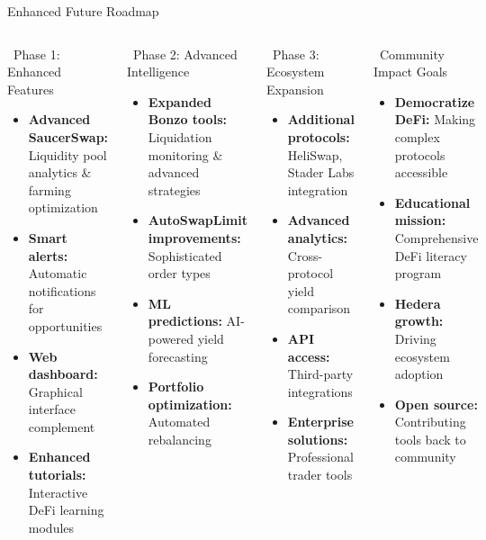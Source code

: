 \documentclass[aspectratio=169]{beamer}
\begin{document}
\begin{frame}{Enhanced Future Roadmap}
\begin{columns}
\begin{block}{\faRocket\ Phase 1: Enhanced Features}
\begin{itemize}
\setlength\itemsep{-0.1em}
\item \textbf{Advanced SaucerSwap:} Liquidity pool analytics \& farming optimization
\item \textbf{Smart alerts:} Automatic notifications for opportunities
\item \textbf{Web dashboard:} Graphical interface complement
\item \textbf{Enhanced tutorials:} Interactive DeFi learning modules
\end{itemize}
\end{block}

\begin{block}{\faRobot\ Phase 2: Advanced Intelligence}
\begin{itemize}
\setlength\itemsep{-0.1em}
\item \textbf{Expanded Bonzo tools:} Liquidation monitoring \& advanced strategies
\item \textbf{AutoSwapLimit improvements:} Sophisticated order types
\item \textbf{ML predictions:} AI-powered yield forecasting
\item \textbf{Portfolio optimization:} Automated rebalancing
\end{itemize}
\end{block}

\begin{block}{\faGlobe\ Phase 3: Ecosystem Expansion}
\begin{itemize}
\setlength\itemsep{-0.1em}
\item \textbf{Additional protocols:} HeliSwap, Stader Labs integration
\item \textbf{Advanced analytics:} Cross-protocol yield comparison
\item \textbf{API access:} Third-party integrations
\item \textbf{Enterprise solutions:} Professional trader tools
\end{itemize}
\end{block}

\begin{block}{\faHeart\ Community Impact Goals}
\begin{itemize}
\setlength\itemsep{-0.1em}
\item \textbf{Democratize DeFi:} Making complex protocols accessible
\item \textbf{Educational mission:} Comprehensive DeFi literacy program
\item \textbf{Hedera growth:} Driving ecosystem adoption
\item \textbf{Open source:} Contributing tools back to community
\end{itemize}
\end{block}
\end{columns}
\end{frame}
\end{document}
